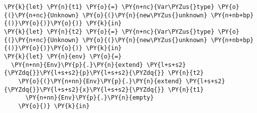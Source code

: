 \begin{Verbatim}[commandchars=\\\{\}]
\PY{k}{let} \PY{n}{t1} \PY{o}{=} \PY{n+nc}{Var\PYZus{}type} \PY{o}{(}\PY{n+nc}{Unknown} \PY{o}{(}\PY{n}{new\PYZus{}unknown} \PY{n+nb+bp}{()}\PY{o}{)}\PY{o}{)} \PY{k}{in}
\PY{k}{let} \PY{n}{t2} \PY{o}{=} \PY{n+nc}{Var\PYZus{}type} \PY{o}{(}\PY{n+nc}{Unknown} \PY{o}{(}\PY{n}{new\PYZus{}unknown} \PY{n+nb+bp}{()}\PY{o}{)}\PY{o}{)} \PY{k}{in}
\PY{k}{let} \PY{n}{env} \PY{o}{=}
  \PY{n+nn}{Env}\PY{p}{.}\PY{n}{extend} \PY{l+s+s2}{\PYZdq{}}\PY{l+s+s2}{p}\PY{l+s+s2}{\PYZdq{}} \PY{n}{t2}
    \PY{o}{(}\PY{n+nn}{Env}\PY{p}{.}\PY{n}{extend} \PY{l+s+s2}{\PYZdq{}}\PY{l+s+s2}{x}\PY{l+s+s2}{\PYZdq{}} \PY{n}{t1}
      \PY{n+nn}{Env}\PY{p}{.}\PY{n}{empty}
    \PY{o}{)} \PY{k}{in}
\end{Verbatim}
